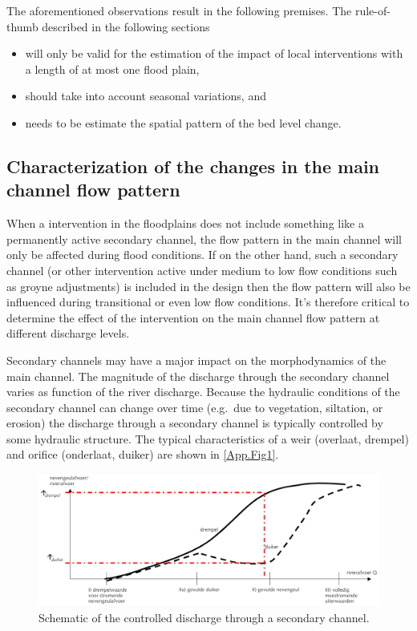 The aforementioned observations result in the following premises.
The rule-of-thumb described in the following sections

\begin{itemize}
\item will only be valid for the estimation of the impact of local interventions with a length of at most one flood plain,

\item should take into account seasonal variations, and

\item needs to be estimate the spatial pattern of the bed level change.
\end{itemize}


\subsection{Characterization of the changes in the main channel flow pattern}

When a intervention in the floodplains does not include something like a permanently active secondary channel, the flow pattern in the main channel will only be affected during flood conditions.
If on the other hand, such a secondary channel (or other intervention active under medium to low flow conditions such as groyne adjustments) is included in the design then the flow pattern will also be influenced during transitional or even low flow conditions.
It's therefore critical to determine the effect of the intervention on the main channel flow pattern at different discharge levels.

Secondary channels may have a major impact on the morphodynamics of the main channel.
The magnitude of the discharge through the secondary channel varies as function of the river discharge.
Because the hydraulic conditions of the secondary channel can change over time (e.g.~due to vegetation, siltation, or erosion) the discharge through a secondary channel is typically controlled by some hydraulic structure.
The typical characteristics of a weir (overlaat, drempel) and orifice (onderlaat, duiker) are shown in \autoref{App.Fig1}.

\begin{figure}
\includegraphics[width=\columnwidth]{figures/Fig1.png}
\caption{Schematic of the controlled discharge through a secondary channel.}
\label{App.Fig1}
\end{figure}

